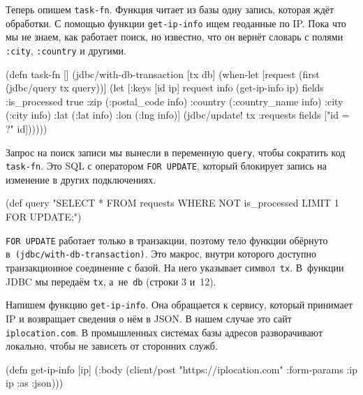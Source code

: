Теперь опишем \verb|task-fn|. Функция читает из базы одну запись, которая
ждёт обработки. С помощью функции \verb|get-ip-info| ищем геоданные по
IP. Пока что мы не знаем, как работает поиск, но известно, что он вернёт словарь
с полями \verb|:city|, \verb|:country| и другими.


\begin{english}
  \begin{clojure/lines}
(defn task-fn []
  (jdbc/with-db-transaction [tx db]
    (when-let [request (first (jdbc/query tx query))]
      (let [{:keys [id ip]} request
            info   (get-ip-info ip)
            fields {:is_processed true
                    :zip (:postal_code info)
                    :country (:country_name info)
                    :city (:city info)
                    :lat (:lat info)
                    :lon (:lng info)}]
        (jdbc/update! tx :requests
                      fields
                      ["id = ?" id])))))
  \end{clojure/lines}
\end{english}


Запрос на поиск записи мы вынесли в переменную \verb|query|, чтобы сократить
код \verb|task-fn|. Это SQL с оператором \verb|FOR UPDATE|, который
блокирует запись на изменение в других подключениях.

\begin{english}
  \begin{clojure}
(def query
  "SELECT * FROM requests WHERE NOT is_processed
   LIMIT 1 FOR UPDATE;")
  \end{clojure}
\end{english}

\verb|FOR UPDATE| работает только в транзакции, поэтому тело функции обёрнуто
в~\verb|(jdbc/with-db-transaction)|. Это макрос, внутри которого доступно
транзакционное соединение с базой. На него указывает символ~\verb|tx|. В~функции
JDBC мы передаём \verb|tx|, а~не~\verb|db| (строки 3 и~12).


Напишем функцию \verb|get-ip-info|. Она обращается к сервису, который принимает
IP и возвращает сведения о нём в JSON. В нашем случае это сайт
\verb|iplocation.com|. В промышленных системах базы адресов разворачивают
локально, чтобы не зависеть от сторонних служб.

\begin{english}
  \begin{clojure}
(defn get-ip-info [ip]
  (:body (client/post "https://iplocation.com"
                      {:form-params {:ip ip}
                       :as :json})))
  \end{clojure}
\end{english}


